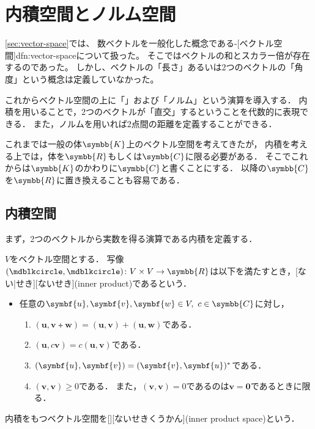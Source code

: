 \documentclass[../sotsu.tex]{subfiles}
\begin{document}
\section{内積空間とノルム空間}
\label{sec:inner-product-space}

\cref{sec:vector-space}では、
数ベクトルを一般化した概念である-[ベクトル空間]{dfn:vector-space}について扱った。
そこではベクトルの和とスカラー倍が存在するのであった。
しかし、ベクトルの「長さ」あるいは2つのベクトルの「角度」という概念は定義していなかった。

これからベクトル空間の上に「」および「ノルム」という演算を導入する．
内積を用いることで，2つのベクトルが「直交」するということを代数的に表現できる．
また，ノルムを用いれば2点間の距離を定義することができる．

これまでは一般の体$\symbb{K}$上のベクトル空間を考えてきたが，
内積を考える上では，体を$\symbb{R}$もしくは$\symbb{C}$に限る必要がある．
そこでこれからは$\symbb{K}$のかわりに$\symbb{C}$と書くことにする．
以降の$\symbb{C}$を$\symbb{R}$に置き換えることも容易である．


\subsection{内積空間}
\label{sec:inner-product-space}

まず，2つのベクトルから実数を得る演算である内積を定義する．

\begin{definition}[内積]
    \label{dfn:inner-product}
    $V$をベクトル空間とする．
    写像$({\bigdot}, {\bigdot}) \colon V \times V \to \symbb{R}$は以下を満たすとき，[ない|せき][ないせき](inner product)であるという．
    \begin{itemize}
        \item 任意の$\symbf{u}, \symbf{v}, \symbf{w} \in V, \  c \in \symbb{C}$に対し，
        \begin{enumerate}
            \item \label{innerp:sum} $(\symbf{u}, \symbf{v} \tplus \symbf{w}) = (\symbf{u}, \symbf{v}) + (\symbf{u}, \symbf{w})$である．
            \item \label{innerp:scalar} $(\symbf{u}, c\symbf{v}) = c(\symbf{u}, \symbf{v})$である．
            \item \label{innerp:conjugate-symmetry} $(\symbf{u}, \symbf{v}) = \conj{(\symbf{v}, \symbf{u})}$である．
            \item \label{innerp:positive-definiteness}$(\symbf{v}, \symbf{v}) \geq 0$である．
                また，$(\symbf{v}, \symbf{v}) = 0$であるのは$\symbf{v} = \symbf{0}$であるときに限る．
        \end{enumerate}
    \end{itemize}
    内積をもつベクトル空間を[][ないせきくうかん](inner product space)という．
\end{definition}
\end{document}
